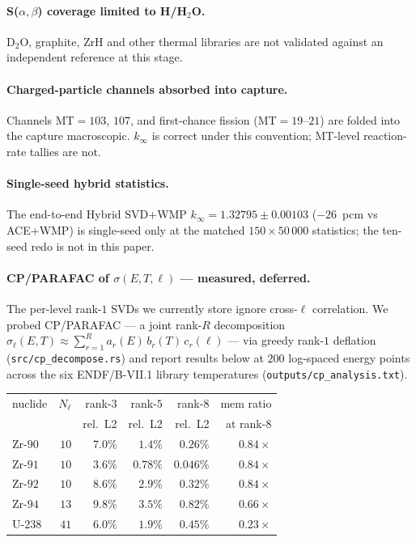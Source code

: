 \paragraph{S($\alpha,\beta$) coverage limited to H/H$_2$O.}
D$_2$O, graphite, ZrH and other thermal libraries are not
validated against an independent reference at this stage.

\paragraph{Charged-particle channels absorbed into capture.}
Channels MT$=103$, $107$, and first-chance fission
(MT$=19$--$21$) are folded into the capture macroscopic.
$k_\infty$ is correct under this convention; MT-level
reaction-rate tallies are not.

\paragraph{Single-seed hybrid statistics.}
The end-to-end Hybrid SVD+WMP $k_\infty = 1.32795 \pm
0.00103$ ($-26$~pcm vs ACE+WMP) is single-seed only at
the matched $150 \times 50\,000$ statistics; the
ten-seed redo is not in this paper.

\paragraph{CP/PARAFAC of $\sigma(E, T, \ell)$ — measured,
deferred.}
\label{sec:cp_probe}
The per-level rank-$1$ SVDs we currently store ignore
cross-$\ell$ correlation. We probed CP/PARAFAC --- a
joint rank-$R$ decomposition $\sigma_\ell(E,T) \approx
\sum_{r=1}^R a_r(E)\, b_r(T)\, c_r(\ell)$ --- via greedy
rank-$1$ deflation (\texttt{src/cp\_decompose.rs}) and
report results below at $200$ log-spaced energy points
across the six ENDF/B-VII.1 library temperatures
(\texttt{outputs/cp\_analysis.txt}).

\begin{tabular}{lrrrrr}
\toprule
nuclide & $N_\ell$ & rank-$3$ & rank-$5$ & rank-$8$ & mem ratio \\
        &          & rel.\ L2 & rel.\ L2 & rel.\ L2 & at rank-$8$ \\
\midrule
Zr-$90$ & $10$ & $7.0\%$ & $1.4\%$  & $0.26\%$  & $0.84\times$ \\
Zr-$91$ & $10$ & $3.6\%$ & $0.78\%$ & $0.046\%$ & $0.84\times$ \\
Zr-$92$ & $10$ & $8.6\%$ & $2.9\%$  & $0.32\%$  & $0.84\times$ \\
Zr-$94$ & $13$ & $9.8\%$ & $3.5\%$  & $0.82\%$  & $0.66\times$ \\
U-$238$ & $41$ & $6.0\%$ & $1.9\%$  & $0.45\%$  & $\mathbf{0.23\times}$ \\
\bottomrule
\end{tabular}

